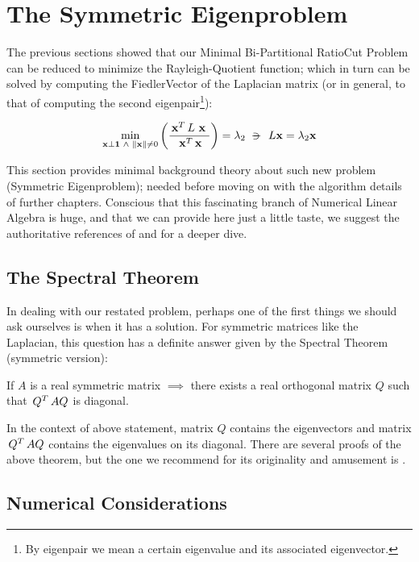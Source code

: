 \section{The Symmetric Eigenproblem}

The previous sections showed that our Minimal Bi-Partitional RatioCut
Problem can be reduced to minimize the Rayleigh-Quotient function;
which in turn can be solved by computing the \gls{FiedlerVector} of the
\gls{Laplacian} matrix (or in general, to that of computing the second
eigenpair\footnote{By eigenpair we mean a certain eigenvalue and its associated eigenvector.}): 

\begin{equation*}
\min\limits_{\vec{x} \bot \vec{1} \ds{\land} \norm{\vec{x}} \ne 0}
\left(  
\dfrac{\trans{\vec{x}} L \ds{\vec{x}}}{\trans{\vec{x}} \vec{x}}
\right)
= \lambda_2
\suchthat{L\vec{x} = \lambda_2\vec{x}}  
\end{equation*}
\joinbelow{1cm}

This section provides minimal background theory about such new problem
(Symmetric Eigenproblem); needed before moving on with the algorithm
details of further chapters. Conscious that this fascinating branch of
Numerical Linear Algebra is huge, and that we can provide here just a
little taste, we suggest the authoritative references of
\cite{parlett80} and \cite{saad92} for a deeper dive. 

\subsection{The Spectral Theorem}

In dealing with our restated problem, perhaps one of the first things
we should ask ourselves is when it has a solution. For symmetric
matrices like the \gls{Laplacian}, this question has a definite answer given
by the Spectral Theorem (symmetric version):

\begin{theorem*}
If $A$ is a real symmetric matrix $\implies$ there exists a real orthogonal matrix $Q$ such that $\,{Q}^{T}\,AQ$ is diagonal. 
\end{theorem*}
\joinbelow{1cm}

In the context of above statement, matrix $Q$ contains the
eigenvectors and matrix $\,{Q}^{T}\,AQ$ contains the eigenvalues on its
diagonal. There are several proofs of the above theorem, but the one we
recommend for its originality and amusement is \cite{wilf81}.

\subsection{Numerical Considerations}

